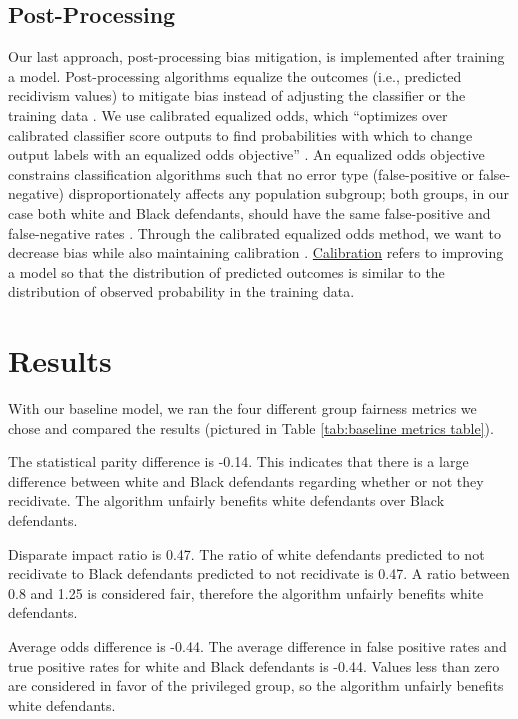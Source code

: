 \documentclass[water,article,submit,moreauthors,pdftex]{mdpi}
\begin{document}
\hypertarget{post-processing}{%
\subsection{Post-Processing}\label{post-processing}}

Our last approach, post-processing bias mitigation, is implemented after
training a model. Post-processing algorithms equalize the outcomes
(i.e., predicted recidivism values) to mitigate bias instead of
adjusting the classifier or the training data \citep{baxter2021AI}. We
use calibrated equalized odds, which ``optimizes over calibrated
classifier score outputs to find probabilities with which to change
output labels with an equalized odds objective''
\citep{aif360-oct-2018}. An equalized odds objective constrains
classification algorithms such that no error type (false-positive or
false-negative) disproportionately affects any population subgroup; both
groups, in our case both white and Black defendants, should have the
same false-positive and false-negative rates \citep{pleiss2017fairness}.
Through the calibrated equalized odds method, we want to decrease bias
while also maintaining calibration \citep{pleiss2017fairness}.
\href{https://medium.com/analytics-vidhya/calibration-in-machine-learning-e7972ac93555}{Calibration}
refers to improving a model so that the distribution of predicted
outcomes is similar to the distribution of observed probability in the
training data.

\hypertarget{results}{%
\section{Results}\label{results}}

With our baseline model, we ran the four different group fairness
metrics we chose and compared the results (pictured in Table
\ref{tab:baseline metrics table}).

The statistical parity difference is -0.14. This indicates that there is
a large difference between white and Black defendants regarding whether
or not they recidivate. The algorithm unfairly benefits white defendants
over Black defendants.

Disparate impact ratio is 0.47. The ratio of white defendants predicted
to not recidivate to Black defendants predicted to not recidivate is
0.47. A ratio between 0.8 and 1.25 is considered fair, therefore the
algorithm unfairly benefits white defendants.

Average odds difference is -0.44. The average difference in false
positive rates and true positive rates for white and Black defendants is
-0.44. Values less than zero are considered in favor of the privileged
group, so the algorithm unfairly benefits white defendants.
\end{document}
